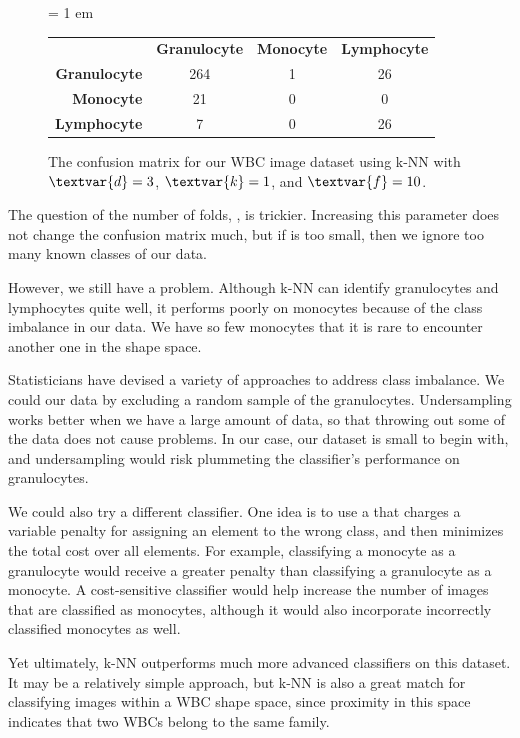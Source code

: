 \begin{figure}[h]
\centering
\tabcolsep = 1 em
\mySfFamily
{}
\begin{tabular}{r c c c}
\rowcolor{gray!50}
& \textbf{Granulocyte} & \textbf{Monocyte} & \textbf{Lymphocyte} \\
\textbf{Granulocyte} & 264 & 1 & 26 \\
\textbf{Monocyte} & \phantom{5}21 & 0 & \phantom{5}0 \\
\textbf{Lymphocyte} & \phantom{55}7 & 0 & 26
\end{tabular}
\caption{The confusion matrix for our WBC image dataset using k-NN with $\textvar{d} = \text{3}$, $\textvar{k} = \text{1}$, and $\textvar{f} = \text{10}$.}
\label{fig:wbc_too_many_neighbors}
\end{figure}

The question of the number of folds, , is trickier. Increasing this parameter does not change the confusion matrix much, but if  is too small, then we ignore too many known classes of our data.

However, we still have a problem. Although k-NN can identify granulocytes and lymphocytes quite well, it performs poorly on monocytes because of the class imbalance in our data. We have so few monocytes that it is rare to encounter another one in the shape space.

Statisticians have devised a variety of approaches to address class imbalance. We could  our data by excluding a random sample of the granulocytes. Undersampling works better when we have a large amount of data, so that throwing out some of the data does not cause problems. In our case, our dataset is small to begin with, and undersampling would risk plummeting the classifier's performance on granulocytes.

We could also try a different classifier. One idea is to use a  that charges a variable penalty for assigning an element to the wrong class, and then minimizes the total cost over all elements. For example, classifying a monocyte as a granulocyte would receive a greater penalty than classifying a granulocyte as a monocyte. A cost-sensitive classifier would help increase the number of images that are classified as monocytes, although it would also incorporate incorrectly classified monocytes as well.

Yet ultimately, k-NN outperforms much more advanced classifiers on this dataset. It may be a relatively simple approach, but k-NN is also a great match for classifying images within a WBC shape space, since proximity in this space indicates that two WBCs belong to the same family.

